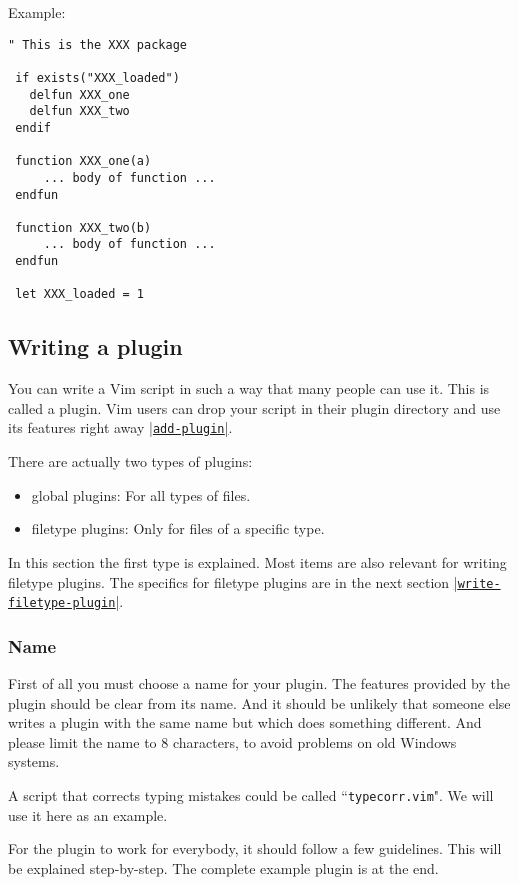Example:

\begin{Verbatim}[samepage=true]
 " This is the XXX package

 if exists("XXX_loaded")
   delfun XXX_one
   delfun XXX_two
 endif

 function XXX_one(a)
     ... body of function ...
 endfun

 function XXX_two(b)
     ... body of function ...
 endfun

 let XXX_loaded = 1
\end{Verbatim}
\subsection{Writing a plugin}
\label{Writing a plugin}
\label{write-plugin}
You can write a Vim script in such a way that many people can use it.
This is called a plugin.
Vim users can drop your script in their plugin directory and use its features right away \hyperref[add-plugin]{|\texttt{add-plugin}|}.

There are actually two types of plugins:
\begin{itemize}
				\item global plugins: For all types of files.
				\item filetype plugins: Only for files of a specific type.
\end{itemize}

In this section the first type is explained.
Most items are also relevant for writing filetype plugins.
The specifics for filetype plugins are in the next section \hyperref[write-filetype-plugin]{|\texttt{write-filetype-plugin}|}.

\subsubsection{Name}
First of all you must choose a name for your plugin.
The features provided by the plugin should be clear from its name.
And it should be unlikely that someone else writes a plugin with the same name but which does something different.
And please limit the name to 8 characters, to avoid problems on old Windows systems.

A script that corrects typing mistakes could be called ``\texttt{typecorr.vim}".
We will use it here as an example.

For the plugin to work for everybody, it should follow a few guidelines.
This will be explained step-by-step.
The complete example plugin is at the end.

